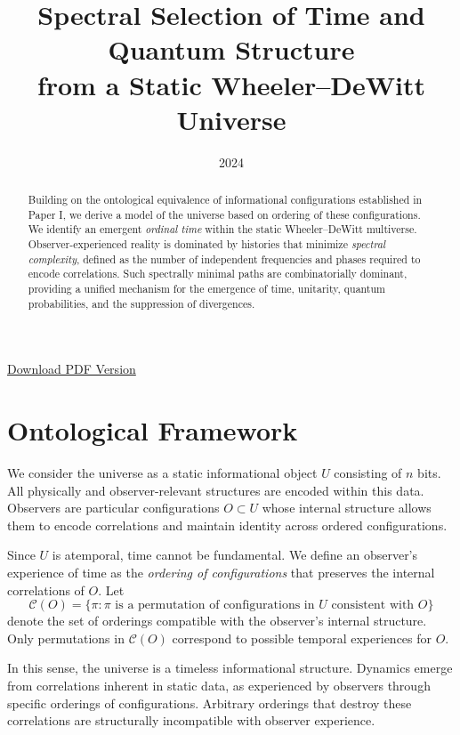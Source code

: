 \documentclass[11pt]{article}
\title{Spectral Selection of Time and Quantum Structure \\
from a Static Wheeler--DeWitt Universe}
\date{2024}
\begin{document}
\maketitle

\begin{abstract}  
Building on the ontological equivalence of informational configurations established in Paper I,
we derive a model of the universe based on ordering of these configurations.
We identify an emergent \emph{ordinal time} within the static Wheeler--DeWitt multiverse.
Observer-experienced reality is dominated by histories that minimize \emph{spectral complexity},
defined as the number of independent frequencies and phases required to encode correlations.
Such spectrally minimal paths are combinatorially dominant, providing a unified mechanism for the
emergence of time, unitarity, quantum probabilities, and the suppression of divergences.
\end{abstract}

\ifdefined\ishtml
\begin{center}
\small \href{emergence-of-time.pdf}{Download PDF Version}
\end{center}
\fi

\section{Ontological Framework}

We consider the universe as a static informational object \(U\) consisting of \(n\) bits.
All physically and observer-relevant structures are encoded within this data.
Observers are particular configurations \(O \subset U\) whose internal structure allows
them to encode correlations and maintain identity across ordered configurations.

Since \(U\) is atemporal, time cannot be fundamental.
We define an observer's experience of time as the \emph{ordering of configurations}
that preserves the internal correlations of \(O\).
Let
\begin{equation}
\mathcal{C}(O) = \{\pi : \pi \text{ is a permutation of configurations in } U
\text{ consistent with } O \}
\end{equation}
denote the set of orderings compatible with the observer's internal structure.
Only permutations in \(\mathcal{C}(O)\) correspond to possible temporal experiences for \(O\).

In this sense, the universe is a timeless informational structure.
Dynamics emerge from correlations inherent in static data, as experienced by observers
through specific orderings of configurations.
Arbitrary orderings that destroy these correlations are structurally incompatible
with observer experience.
\end{document}
